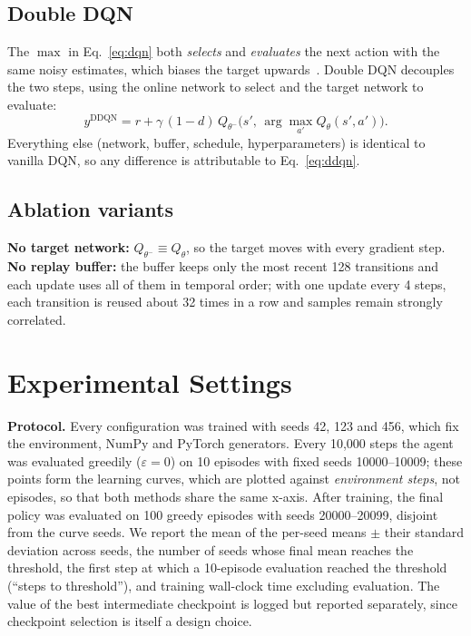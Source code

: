 \documentclass[10pt,twocolumn,letterpaper]{article}
\newcommand{\eps}{\varepsilon}
\begin{document}
\subsection{Double DQN}
The $\max$ in Eq.~\eqref{eq:dqn} both \emph{selects} and \emph{evaluates} the next action with the same noisy estimates, which biases the target upwards~\cite{thrun1993,vanhasselt2016}. Double DQN decouples the two steps, using the online network to select and the target network to evaluate:
\begin{equation}
y^{\text{DDQN}} = r + \gamma\,(1-d)\,Q_{\theta^-}\!\big(s',\,\arg\max_{a'} Q_\theta(s',a')\big).
\label{eq:ddqn}
\end{equation}
Everything else (network, buffer, schedule, hyperparameters) is identical to vanilla DQN, so any difference is attributable to Eq.~\eqref{eq:ddqn}.

\subsection{Ablation variants}
\textbf{No target network:} $Q_{\theta^-}\equiv Q_\theta$, so the target moves with every gradient step. \textbf{No replay buffer:} the buffer keeps only the most recent 128 transitions and each update uses all of them in temporal order; with one update every 4 steps, each transition is reused about 32 times in a row and samples remain strongly correlated.

\section{Experimental Settings}

\textbf{Protocol.} Every configuration was trained with seeds 42, 123 and 456, which fix the environment, NumPy and PyTorch generators. Every 10{,}000 steps the agent was evaluated greedily ($\eps=0$) on 10 episodes with fixed seeds 10000--10009; these points form the learning curves, which are plotted against \emph{environment steps}, not episodes, so that both methods share the same x-axis. After training, the final policy was evaluated on 100 greedy episodes with seeds 20000--20099, disjoint from the curve seeds. We report the mean of the per-seed means $\pm$ their standard deviation across seeds, the number of seeds whose final mean reaches the threshold, the first step at which a 10-episode evaluation reached the threshold (``steps to threshold''), and training wall-clock time excluding evaluation. The value of the best intermediate checkpoint is logged but reported separately, since checkpoint selection is itself a design choice.
\end{document}
